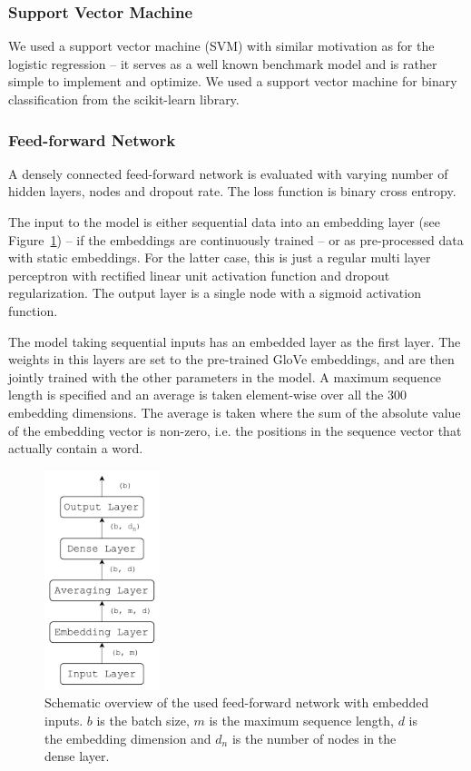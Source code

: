 \subsubsection{Support Vector Machine}
We used a support vector machine (SVM) with similar motivation as for the logistic regression -- it serves as a well known benchmark model and is rather simple to implement and optimize.  We used a support vector machine for binary classification from the scikit-learn library. 

\subsubsection{Feed-forward Network}
A densely connected feed-forward network is evaluated with varying number of hidden layers, nodes and dropout rate. The loss function is binary cross entropy. 

The input to the model is either sequential data into an embedding layer (see Figure~\ref{fig:emb_ff}) -- if the embeddings are continuously trained -- or as pre-processed data with static embeddings. For the latter case, this is just a regular multi layer perceptron with rectified linear unit activation function and dropout regularization. The output layer is a single node with a sigmoid activation function.

The model taking sequential inputs has an embedded layer as the first layer. The weights in this layers are set to the pre-trained GloVe embeddings, and are then jointly trained with the other parameters in the model. A maximum sequence length is specified and an average is taken element-wise over all the 300 embedding dimensions. The average is taken where the sum of the absolute value of the embedding vector is non-zero, i.e. the positions in the sequence vector that actually contain a word.

\begin{figure}[H]
    \centering
    \includegraphics[width=0.3\textwidth]{Figures/figs-ff_emb.pdf}
    \caption{Schematic overview of the used feed-forward network with embedded inputs. $b$ is the batch size, $m$ is the maximum sequence length, $d$ is the embedding dimension and $d_n$ is the number of nodes in the dense layer.}
\label{fig:emb_ff}
\end{figure}

